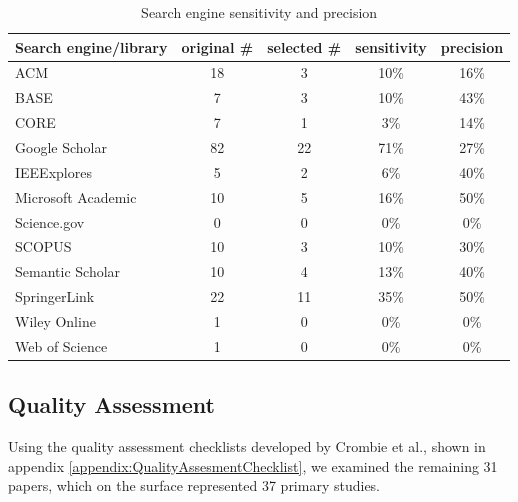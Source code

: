 \begin{table}[h]
    \begin{center}
        \begin{tabular}{ | l | c | c | c | c |} 
            \hline
            Search engine/library     & original \# & selected \# & sensitivity & precision\\
            \hline
            \hline
            ACM                        & 18          & 3           & 10\%        &  16\%    \\
            BASE                       & 7           & 3           & 10\%        &  43\%    \\
            CORE                       & 7           & 1           &  3\%        &  14\%    \\
            Google Scholar             & 82          & 22          & 71\%        &  27\%    \\
            IEEExplores                & 5           & 2           &  6\%        &  40\%    \\
            Microsoft Academic         & 10          & 5           & 16\%        &  50\%    \\
            Science.gov                & 0           & 0           &  0\%        &   0\%    \\
            SCOPUS                     & 10          & 3           & 10\%        &  30\%    \\
            Semantic Scholar           & 10          & 4           & 13\%        &  40\%    \\
            SpringerLink               & 22          & 11          & 35\%        &  50\%    \\
            Wiley Online               & 1           & 0           &  0\%        &   0\%    \\
            Web of Science             & 1           & 0           &  0\%        &   0\%    \\
            \hline
        \end{tabular}
    \end{center}
    \caption{Search engine sensitivity and precision}
    \label{table:sensitivity_precision}
\end{table}


\subsection{Quality Assessment}
Using the quality assessment checklists developed by Crombie et al.\cite{crombie1997pocket}, shown in appendix \ref{appendix:QualityAssesmentChecklist}, we examined the remaining 31 papers, which on the surface represented 37 primary studies.

